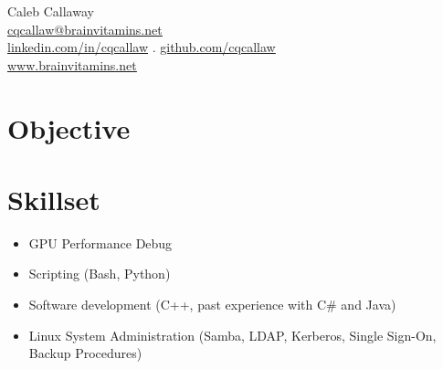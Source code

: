 \documentclass{article}
\begin{document}
	\begin{center}
		{\Large Caleb Callaway}\\
		\href{mailto:cqcallaw@brainvitamins.net}{\ul{cqcallaw@brainvitamins.net}}\\
		\href{http://linkedin.com/in/cqcallaw/}{\ul{linkedin.com/in/cqcallaw}} . \href{https://github.com/cqcallaw/}{\ul{github.com/cqcallaw}}\\
		\href{https://www.brainvitamins.net/}{\ul{www.brainvitamins.net}}
	\end{center}

	\section*{Objective}

	\section*{Skillset}
	\begin{itemize}[label={}]
		\item GPU Performance Debug
		\item Scripting (Bash, Python)
		\item Software development (C++, past experience with C\# and Java)
		\item Linux System Administration (Samba, LDAP, Kerberos, Single Sign-On, Backup Procedures)
	\end{itemize}
\end{document}
